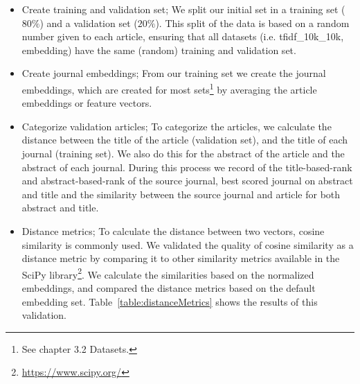 \documentclass[../../paper.tex]{subfiles}
\begin{document}
\begin{itemize}
\item{Create training and validation set;
We split our initial set in a training set ($80\%$) and a validation set ($20\%$). This split of the data is based on a random number given to each article, ensuring that all datasets (i.e. tfidf\_10k\_10k, embedding) have the same (random) training and validation set.}
\item{Create journal embeddings;
From our training set we create the journal embeddings, which are created for most sets\footnote{See chapter 3.2 Datasets.} by averaging the article embeddings or feature vectors.}
\item{Categorize validation articles;
To categorize the articles, we calculate the distance between the title of the article (validation set), and the title of each journal (training set). We also do this for the abstract of the article and the abstract of each journal. During this process we record of the title-based-rank and abstract-based-rank of the source journal, best scored journal on abstract and title and the similarity between the source journal and article for both abstract and title.}
\item{Distance metrics;
To calculate the distance between two vectors, cosine similarity is commonly used. We validated the quality of cosine similarity as a distance metric by comparing it to other similarity metrics available in the SciPy library\footnote{\url{https://www.scipy.org/}}. We calculate the similarities based on the normalized embeddings, and compared the distance metrics based on the default embedding set. Table~\ref{table:distanceMetrics} shows the results of this validation.}
\end{itemize} 
\end{document}

